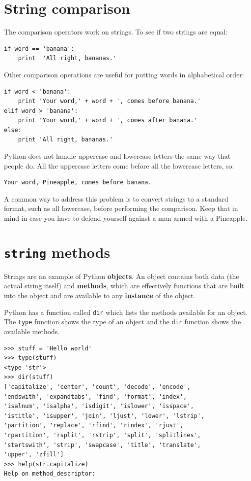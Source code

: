 {\section{String comparison}


The comparison operators work on strings.  To see if two strings are equal:

\beforeverb
\begin{verbatim}
if word == 'banana':
    print  'All right, bananas.'
\end{verbatim}
\afterverb
%
Other comparison operations are useful for putting words in alphabetical
order:

\beforeverb
\begin{verbatim}
if word < 'banana':
    print 'Your word,' + word + ', comes before banana.'
elif word > 'banana':
    print 'Your word,' + word + ', comes after banana.'
else:
    print 'All right, bananas.'
\end{verbatim}
\afterverb
%
Python does not handle uppercase and lowercase letters the same way
that people do.  All the uppercase letters come before all the
lowercase letters, so:

\beforeverb
\begin{verbatim}
Your word, Pineapple, comes before banana.
\end{verbatim}
\afterverb
%
A common way to address this problem is to convert strings to a
standard format, such as all lowercase, before performing the
comparison.  Keep that in mind in case you have to defend yourself
against a man armed with a Pineapple.


\section{{\tt string} methods}

Strings are an example of Python {\bf objects}.  An object contains
both data (the actual string itself) and {\bf methods}, which
are effectively functions that are built into the object and 
are available to any {\bf instance} of the object.

Python has a function called {\tt dir} which lists the methods available
for an object.  The {\tt type} function shows the type of an object 
and the {\tt dir} function shows the available methods.

\beforeverb
\begin{verbatim}
>>> stuff = 'Hello world'
>>> type(stuff)
<type 'str'>
>>> dir(stuff)
['capitalize', 'center', 'count', 'decode', 'encode', 
'endswith', 'expandtabs', 'find', 'format', 'index', 
'isalnum', 'isalpha', 'isdigit', 'islower', 'isspace', 
'istitle', 'isupper', 'join', 'ljust', 'lower', 'lstrip', 
'partition', 'replace', 'rfind', 'rindex', 'rjust', 
'rpartition', 'rsplit', 'rstrip', 'split', 'splitlines', 
'startswith', 'strip', 'swapcase', 'title', 'translate', 
'upper', 'zfill']
>>> help(str.capitalize)
Help on method_descriptor:


\end{verbatim}}
